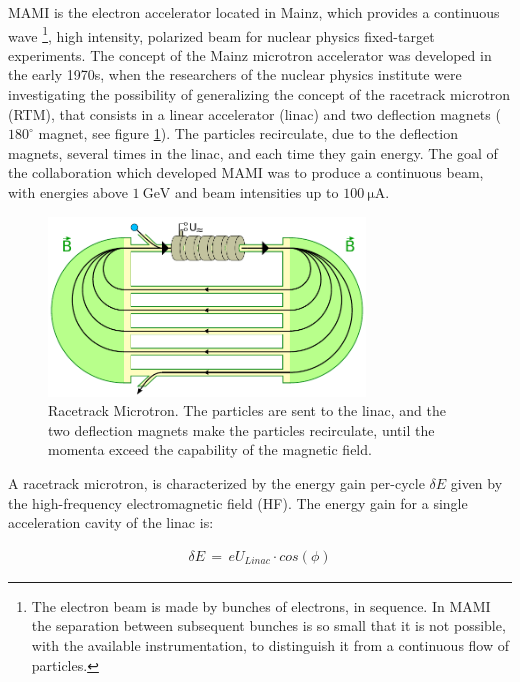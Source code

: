 MAMI is the electron accelerator located in Mainz, which provides a continuous wave \footnote{The electron beam is made by bunches of electrons, in sequence. In MAMI the separation between subsequent bunches is so small that it is not possible, with the available instrumentation, to distinguish it from a continuous flow of particles.}, high intensity, polarized beam for nuclear physics fixed-target experiments. The concept of the Mainz microtron accelerator was developed in the early 1970s, when the researchers of the nuclear physics institute were investigating the possibility of generalizing the concept of the racetrack microtron (RTM), that consists in a linear accelerator (linac) and two deflection magnets ($180^{\circ}$ magnet, see figure \ref{fig:RaceTrackSketch}). The particles recirculate, due to the deflection magnets, several times in the linac, and each time they gain energy.  The goal of the collaboration which developed MAMI was to produce a continuous beam, with energies above $\SI{1}{\giga \electronvolt}$ and beam intensities up to $\SI{100}{\micro \ampere}$.

\begin{figure}[hbtp]

\centering
\includegraphics[width = 0.75\textwidth]{ExperimentalSetup/RacetrackMicrotronSketch.pdf}
\caption{Racetrack Microtron. The particles are sent to the linac, and the two deflection magnets make the particles recirculate, until the momenta exceed the capability of the magnetic field.}
\label{fig:RaceTrackSketch}
\end{figure}

A racetrack microtron, is characterized by the energy gain per-cycle $\delta E$ given by the high-frequency electromagnetic field (HF). The energy gain for a single acceleration cavity of the linac is: 

\begin{align*}
\delta E \, = \, e U_{Linac} \cdot cos(\phi)
\end{align*} 

